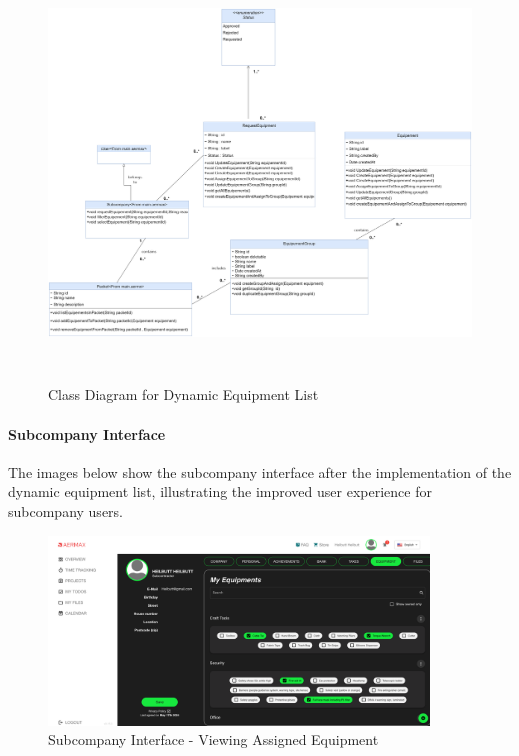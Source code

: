 \begin{figure}[H]
    \centering
    \includegraphics[width=1\textwidth , height=11cm]{src/assets/diagrams/DynamiEquipementListPng.png}
    \caption{Class Diagram for Dynamic Equipment List}
    \label{fig:class_diagram}
\end{figure}
 
\paragraph{Subcompany Interface}
The images below show the subcompany interface after the implementation of the dynamic equipment list, illustrating the improved user experience for subcompany users.

\begin{figure}[H]
    \centering
    \includegraphics[width=0.9\textwidth]{src/assets/images/Interface1.png}
    \caption{Subcompany Interface - Viewing Assigned Equipment}
    \label{fig:subcompany_interface_1}
\end{figure}

